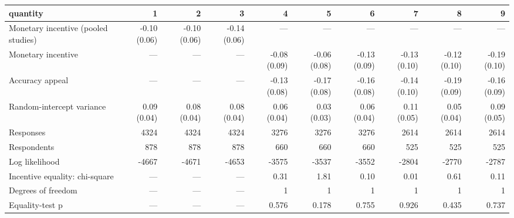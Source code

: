 \begin{tabular}{lrrrrrrrrr}
\toprule
quantity & 1 & 2 & 3 & 4 & 5 & 6 & 7 & 8 & 9 \\
\midrule
Monetary incentive (pooled studies) & -0.10 (0.06) & -0.10 (0.06) & -0.14 (0.06) & — & — & — & — & — & — \\
Monetary incentive & — & — & — & -0.08 (0.09) & -0.06 (0.08) & -0.13 (0.09) & -0.13 (0.10) & -0.12 (0.10) & -0.19 (0.10) \\
Accuracy appeal & — & — & — & -0.13 (0.08) & -0.17 (0.08) & -0.16 (0.08) & -0.14 (0.10) & -0.19 (0.09) & -0.16 (0.09) \\
Random-intercept variance & 0.09 (0.04) & 0.08 (0.04) & 0.08 (0.04) & 0.06 (0.04) & 0.03 (0.03) & 0.06 (0.04) & 0.11 (0.05) & 0.05 (0.04) & 0.09 (0.05) \\
Responses & 4324 & 4324 & 4324 & 3276 & 3276 & 3276 & 2614 & 2614 & 2614 \\
Respondents & 878 & 878 & 878 & 660 & 660 & 660 & 525 & 525 & 525 \\
Log likelihood & -4667 & -4671 & -4653 & -3575 & -3537 & -3552 & -2804 & -2770 & -2787 \\
Incentive equality: chi-square & — & — & — & 0.31 & 1.81 & 0.10 & 0.01 & 0.61 & 0.11 \\
Degrees of freedom & — & — & — & 1 & 1 & 1 & 1 & 1 & 1 \\
Equality-test p & — & — & — & 0.576 & 0.178 & 0.755 & 0.926 & 0.435 & 0.737 \\
\bottomrule
\end{tabular}
